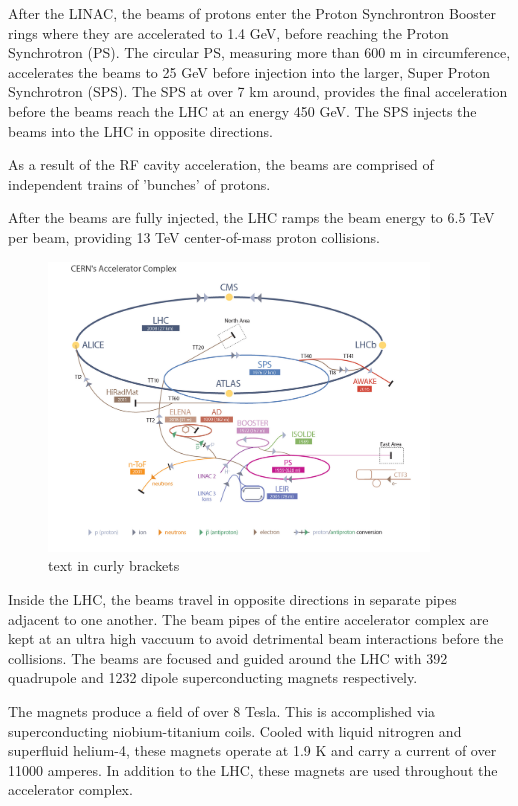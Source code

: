 After the LINAC, the beams of protons enter the Proton Synchrontron Booster rings where
they are accelerated to 1.4 GeV, before reaching the Proton
Synchrotron (PS). The circular PS, measuring more than 600 m
in circumference, accelerates the beams to 25 GeV before injection into the
larger, Super Proton Synchrotron (SPS). The SPS at over 7 km around, provides the final
acceleration before the beams reach the LHC at an energy 450 GeV. The SPS injects the beams into
the LHC in opposite directions.

As a result of the RF cavity acceleration, the beams are comprised of independent
trains of 'bunches' of protons. 
 

After the beams are fully injected, the LHC ramps the beam energy to 6.5 TeV per beam,
providing 13 TeV center-of-mass proton collisions. 

\begin{figure}[hbtp]
 \begin{center}
   \includegraphics[width=0.9\textwidth]{lhc_complex.pdf}
   \caption[text in square brackets]{text in curly brackets}
   \label{fig:lhc_complex}
 \end{center}
\end{figure}

Inside the LHC, the beams travel in opposite directions in separate pipes adjacent to
one another. The beam pipes of the entire accelerator complex are kept at an ultra high vaccuum
to avoid detrimental beam interactions before the collisions. The beams are focused
and guided around the LHC with 392 quadrupole and 1232 dipole superconducting
magnets respectively.

The magnets produce a field of over 8 Tesla. This is accomplished via superconducting 
niobium-titanium coils. Cooled with liquid nitrogren and superfluid helium-4, these
magnets operate at 1.9 K and carry a current of over 11000 amperes. In addition to
the LHC, these magnets are used throughout the accelerator complex.

